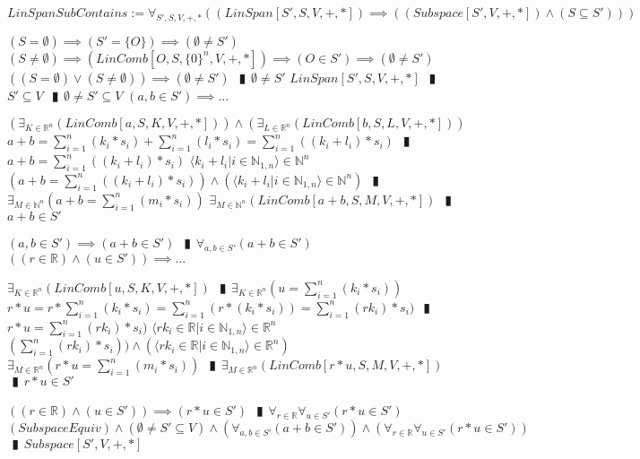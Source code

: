 \documentclass{book}
\newcommand{\abr}{:=}
\newcommand{\pipe}{$\phantom{(}\vrectangleblack\phantom{)}$}
\newcommand{\pr}[1]{\left(#1\right)}
\begin{document}
$LinSpanSubContains \abr \forall_{S', S, V, +, *}\pr{(LinSpan[S', S, V, +, *]) \implies \pr{(Subspace[S', V, +, *]) \land (S \subseteq S')}}$
\begin{enumerate}
  \lit $(S = \emptyset) \implies (S' = \{O\}) \implies (\emptyset \neq S')$
  \lit $(S \neq \emptyset) \implies (LinComb[O, S, \{0\}^n, V, +, *]) \implies (O \in S') \implies (\emptyset \neq S')$
  \lit $\pr{(S = \emptyset) \lor (S \neq \emptyset)} \implies (\emptyset \neq S')$ \pipe $\emptyset \neq S'$
  \lit $LinSpan[S', S, V, +, *]$ \pipe $S' \subseteq V$ \pipe $\emptyset \neq S' \subseteq V$
  \lit $(a, b \in S') \implies \ldots$
  \begin{enumerate}
    \lit $\pr{\exists_{K \in \mathbb{R}^n}(LinComb[a, S, K, V, +, *])} \land \pr{\exists_{L \in \mathbb{R}^n}(LinComb[b, S, L, V, +, *])}$
    \lit $a + b = \sum_{i = 1}^{n}(k_i * s_i) + \sum_{i = 1}^{n}(l_i * s_i) = \sum_{i = 1}^{n}\pr{(k_i + l_i) * s_i}$ \pipe $a + b = \sum_{i = 1}^{n}\pr{(k_i + l_i) * s_i}$
    \lit $\langle k_i + l_i | i \in \mathbb{N}_{1, n} \rangle \in \mathbb{N}^n$
    \lit $\pr{a + b = \sum_{i = 1}^{n}\pr{(k_i + l_i) * s_i}} \land (\langle k_i + l_i | i \in \mathbb{N}_{1, n} \rangle \in \mathbb{N}^n)$ \pipe $\exists_{M \in \mathbb{N}^n}\pr{a + b = \sum_{i = 1}^{n}(m_i * s_i)}$
    \lit $\exists_{M \in \mathbb{N}^n}(LinComb[a + b, S, M, V, +, *])$ \pipe $a + b \in S'$
  \end{enumerate}
  \lit $(a, b \in S') \implies (a + b \in S')$ \pipe $\forall_{a, b \in S'}(a + b \in S')$
  \lit $\pr{(r \in \mathbb{R}) \land (u \in S')} \implies \ldots$
  \begin{enumerate}
    \lit $\exists_{K \in \mathbb{R}^n}(LinComb[u, S, K, V, +, *])$ \pipe $\exists_{K \in \mathbb{R}^n}\pr{u = \sum_{i = 1}^{n}(k_i * s_i)}$
    \lit $r * u = r * \sum_{i = 1}^{n}(k_i * s_i) = \sum_{i = 1}^{n}\pr{r * (k_i * s_i)} = \sum_{i = 1}^{n}(r k_i) * s_i)$ \pipe $r * u = \sum_{i = 1}^{n}(r k_i) * s_i)$
    \lit $\langle r k_i \in \mathbb{R} | i \in \mathbb{N}_{1, n} \rangle \in \mathbb{R}^n$
    \lit $\pr{\sum_{i = 1}^{n}(r k_i) * s_i}) \land (\langle r k_i \in \mathbb{R} | i \in \mathbb{N}_{1, n} \rangle \in \mathbb{R}^n)$
    \lit $\exists_{M \in \mathbb{R}^n}\pr{r * u = \sum_{i = 1}^{n}(m_i * s_i)}$ \pipe $\exists_{M \in \mathbb{R}^n}(LinComb[r * u, S, M, V, +, *])$ \pipe $r * u \in S'$
  \end{enumerate}
  \lit $\pr{(r \in \mathbb{R}) \land (u \in S')} \implies (r * u \in S')$ \pipe $\forall_{r \in \mathbb{R}} \forall_{u \in S'}(r * u \in S')$
  \lit $(SubspaceEquiv) \land (\emptyset \neq S' \subseteq V) \land \pr{\forall_{a, b \in S'}(a + b \in S')} \land \pr{\forall_{r \in \mathbb{R}} \forall_{u \in S'}(r * u \in S')}$ \pipe $Subspace[S', V, +, *]$

\end{enumerate}
\end{document}
